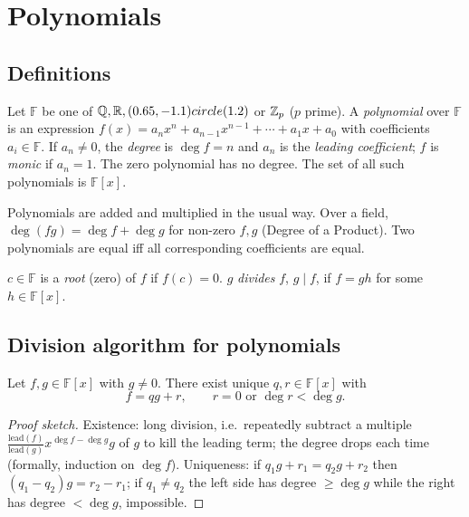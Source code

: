 \chapter{Polynomials}

\section{Definitions}

\begin{definition}
Let $\mathbb F$ be one of $\mathbb{Q}, \mathbb{R}, (0.65,-1.1) circle (1.2)$ or $\mathbb{Z}_{p}$ ($p$ prime). A \emph{polynomial} over
$\mathbb F$ is an expression $f(x) = a_nx^n + a_{n-1}x^{n-1} + \cdots + a_1x + a_0$ with
coefficients $a_i \in \mathbb F$. If $a_n \neq 0$, the \emph{degree} is $\deg f = n$ and $a_n$ is
the \emph{leading coefficient}; $f$ is \emph{monic} if $a_n = 1$. The zero polynomial has no
degree. The set of all such polynomials is $\mathbb F[x]$.
\end{definition}

Polynomials are added and multiplied in the usual way. Over a field,
$\deg(fg) = \deg f + \deg g$ for non-zero $f,g$ (Degree of a Product). Two polynomials are
equal iff all corresponding coefficients are equal.

\begin{definition}
$c \in \mathbb F$ is a \emph{root} (zero) of $f$ if $f(c) = 0$. $g$ \emph{divides} $f$,
$g \mid f$, if $f = gh$ for some $h \in \mathbb F[x]$.
\end{definition}

\section{Division algorithm for polynomials}

\begin{theorem}
Let $f, g \in \mathbb F[x]$ with $g \ne 0$. There exist unique $q, r \in \mathbb F[x]$ with
\[ f = qg + r, \qquad r = 0 \text{ or } \deg r < \deg g. \]
\end{theorem}
\begin{proof}[Proof sketch]
Existence: long division, i.e.\ repeatedly subtract a multiple $\frac{\text{lead}(f)}
{\text{lead}(g)}x^{\deg f - \deg g}g$ of $g$ to kill the leading term; the degree drops each
time (formally, induction on $\deg f$). Uniqueness: if $q_1g + r_1 = q_2g + r_2$ then
$(q_1 - q_2)g = r_2 - r_1$; if $q_1 \ne q_2$ the left side has degree $\ge\deg g$ while the
right has degree $< \deg g$, impossible.
\end{proof}

